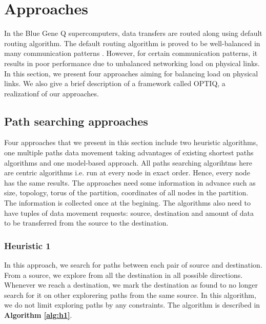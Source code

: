 \section{Approaches}
\label{sec:approach}

In the Blue Gene Q supercomputers, data transfers are routed along using default routing algorithm. The default routing algorithm is proved to be well-balanced in many communication patterns \cite{Chen:BGQ}. However, for certain communication patterns, it results in poor performance due to unbalanced networking load on physical links. In this section, we present four approaches aiming for balancing load on physical links. We also give a brief description of a framework called OPTIQ, a realizationf of our approaches.

\subsection{Path searching approaches}
Four approaches that we present in this section include two heuristic algorithms, one multiple paths data movement taking advantages of existing shortest paths algorithms and one model-based approach. All paths searching algorihtms here are centric algorithms i.e. run at every node in exact order. Hence, every node has the same results. The approaches need some information in advance such as size, topology, torus of the partition, coordinates of all nodes in the partition. The information is collected once at the begining. The algorithms also need to have tuples of data movement requests: source, destination and amount of data to be transferred from the source to the destination.

\subsubsection{Heuristic 1}
In this approach, we search for paths between each pair of source and destination. From a source, we explore from all the destination in all possible directions. Whenever we reach a destination, we mark the destination as found to no longer search for it on other explorering paths from the same source. In this algorithm, we do not limit exploring paths by any constraints. The algorithm is described in \textbf{Algorithm \ref{alg:h1}}.

